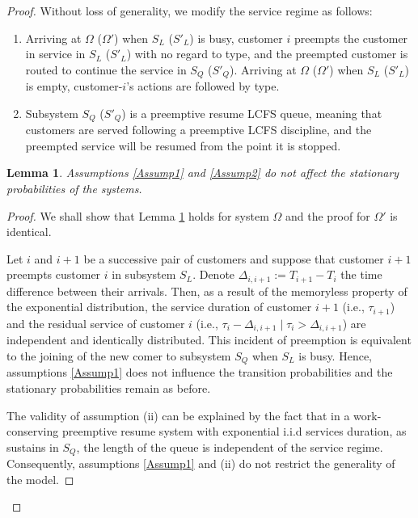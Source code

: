 \documentclass[11pt]{article}
\numberwithin{equation}{section}
\newtheorem{lemma}{Lemma}[proposition]
\begin{document}
\begin{proof}
Without loss of generality, we modify the service regime as follows: 
\begin{enumerate}[label=(\roman*)]
\item\label{Assump1} Arriving at $\Omega$ ($\Omega'$) when $S_L$ ($S'_L$) is busy, customer $i$ preempts the customer in service in $S_L$ ($S'_L$) with no regard to type, and the preempted customer is routed to continue the service in $S_Q$ ($S'_Q$). Arriving at $\Omega$ ($\Omega'$) when $S_L$ ($S'_L$) is empty, customer-$i$'s actions are followed by type.
\item\label{Assump2} Subsystem $S_Q$ ($S'_Q$) is a preemptive resume LCFS queue, meaning that customers are served following a preemptive LCFS discipline, and the preempted service will be resumed from the point it is stopped.
\end{enumerate}

\begin{lemma}
Assumptions {\rm \ref{Assump1}} and {\rm \ref{Assump2}} do not affect the stationary probabilities of the systems. \label{WlogAssump}
\end{lemma}

\begin{proof}

We shall show that Lemma \ref{WlogAssump} holds for system $\Omega$ and the proof for $\Omega'$ is identical. 

Let $i$ and $i+1$ be a successive pair of customers and suppose that customer $i+1$ preempts customer $i$ in subsystem $S_L$. Denote $\Delta_{i,i+1} := T_{i+1}-T_i$ the time difference between their arrivals. Then, as a result of the memoryless property of the exponential distribution, the service duration of customer $i+1$ (i.e., $\tau_{i+1}$) and the residual service of customer $i$ (i.e., $\tau_i-\Delta_{i,i+1} \mid \tau_i>\Delta_{i,i+1}$) are independent and identically distributed. This incident of preemption is equivalent to the joining of the new comer to  subsystem $S_Q$ when $S_L$ is busy. Hence, assumptions \ref{Assump1} does not influence the transition probabilities and the stationary probabilities remain as before.

The validity of assumption (ii) can be explained by the fact that in a work-conserving preemptive resume system with exponential i.i.d services duration, as sustains in $S_Q$, the length of the queue is independent of the service regime. Consequently, assumptions \ref{Assump1} and (ii) do not restrict the generality of the model.
\end{proof}


\end{proof}
\end{document}
